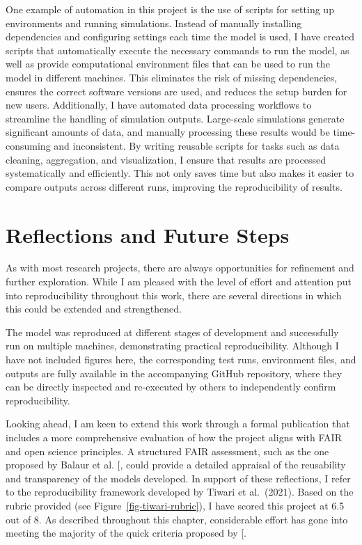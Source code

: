 \documentclass[
  11pt,
  letterpaper,
]{scrreprt}
\begin{document}
One example of automation in this project is the use of scripts for
setting up environments and running simulations. Instead of manually
installing dependencies and configuring settings each time the model is
used, I have created scripts that automatically execute the necessary
commands to run the model, as well as provide computational environment
files that can be used to run the model in different machines. This
eliminates the risk of missing dependencies, ensures the correct
software versions are used, and reduces the setup burden for new users.
Additionally, I have automated data processing workflows to streamline
the handling of simulation outputs. Large-scale simulations generate
significant amounts of data, and manually processing these results would
be time-consuming and inconsistent. By writing reusable scripts for
tasks such as data cleaning, aggregation, and visualization, I ensure
that results are processed systematically and efficiently. This not only
saves time but also makes it easier to compare outputs across different
runs, improving the reproducibility of results.

\section{Reflections and Future
Steps}\label{reflections-and-future-steps}

As with most research projects, there are always opportunities for
refinement and further exploration. While I am pleased with the level of
effort and attention put into reproducibility throughout this work,
there are several directions in which this could be extended and
strengthened.

The model was reproduced at different stages of development and
successfully run on multiple machines, demonstrating practical
reproducibility. Although I have not included figures here, the
corresponding test runs, environment files, and outputs are fully
available in the accompanying GitHub repository, where they can be
directly inspected and re-executed by others to independently confirm
reproducibility.

Looking ahead, I am keen to extend this work through a formal
publication that includes a more comprehensive evaluation of how the
project aligns with FAIR and open science principles. A structured FAIR
assessment, such as the one proposed by Balaur et al.
{[}\citeproc{ref-balaur2025FAIRification}{399}{]}, could provide a
detailed appraisal of the reusability and transparency of the models
developed. In support of these reflections, I refer to the
reproducibility framework developed by Tiwari et al.~(2021). Based on
the rubric provided (see Figure~\ref{fig-tiwari-rubric}), I have scored
this project at 6.5 out of 8. As described throughout this chapter,
considerable effort has gone into meeting the majority of the quick
criteria proposed by
{[}\citeproc{ref-tiwari2021Reproducibility}{400}{]}.
\end{document}
